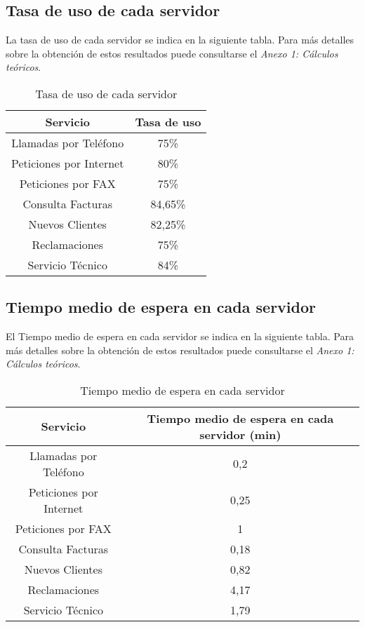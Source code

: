 \subsection{Tasa de uso de cada servidor}
La tasa de uso de cada servidor se indica en la siguiente tabla. Para más detalles sobre la obtención de estos resultados puede consultarse el \textit{Anexo 1: Cálculos teóricos}.\\
\begin{table}[H]
  \begin{center}
  \begin{tabular}{|c|c|}
    \hline
    \textbf{Servicio}       & \textbf{Tasa de uso} \\ \hline
    Llamadas por Teléfono   & 75\%                   \\ \hline
    Peticiones por Internet & 80\%                  \\ \hline
    Peticiones por FAX      & 75\%                   \\ \hline
    Consulta Facturas      & 84,65\%                   \\ \hline
    Nuevos Clientes      & 82,25\%                   \\ \hline
    Reclamaciones      & 75\%                   \\ \hline
    Servicio Técnico      & 84\%                  \\ \hline
  \end{tabular}
\end{center}
  \caption{Tasa de uso de cada servidor}
  \end{table}
\subsection{Tiempo medio de espera en cada servidor}
El Tiempo medio de espera en cada servidor se indica en la siguiente tabla. Para más detalles sobre la obtención de estos resultados puede consultarse el \textit{Anexo 1: Cálculos teóricos}.\\
\begin{table}[H]
  \begin{center}
  \begin{tabular}{|c|c|}
    \hline
    \textbf{Servicio}       & \textbf{Tiempo medio de espera en cada servidor (min)} \\ \hline
    Llamadas por Teléfono   & 0,2                   \\ \hline
    Peticiones por Internet & 0,25                  \\ \hline
    Peticiones por FAX      & 1                   \\ \hline
    Consulta Facturas      & 0,18                   \\ \hline
    Nuevos Clientes      & 0,82                   \\ \hline
    Reclamaciones      & 4,17                   \\ \hline
    Servicio Técnico      & 1,79                   \\ \hline
  \end{tabular}
\end{center}
  \caption{Tiempo medio de espera en cada servidor}
  \end{table}
